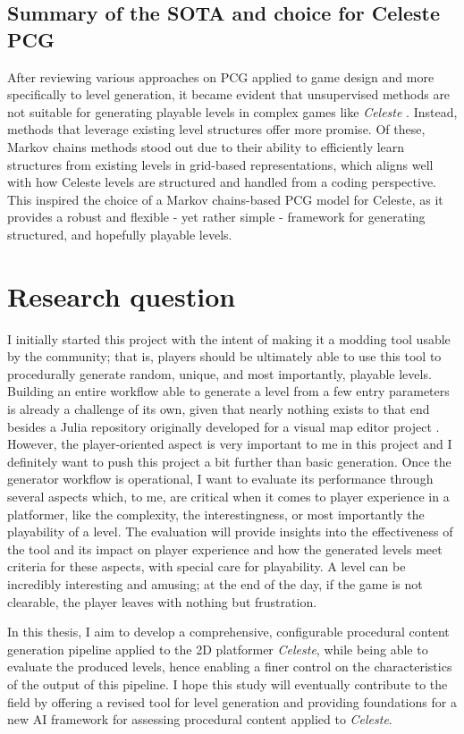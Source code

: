 \documentclass{article}
\newcommand{\Celeste}{\textit{Celeste} }
\newcommand{\Celnosp}{\textit{Celeste}}
\begin{document}
\subsection{Summary of the SOTA and choice for Celeste PCG}
After reviewing various approaches on PCG applied to game design and more specifically to level generation, it became evident that unsupervised methods are not suitable for generating playable levels in complex games like \Celeste. Instead, methods that leverage existing level structures offer more promise. Of these, Markov chains methods stood out due to their ability to efficiently learn structures from existing levels in grid-based representations, which aligns well with how Celeste levels are structured and handled from a coding perspective. This inspired the choice of a Markov chains-based PCG model for Celeste, as it provides a robust and flexible - yet rather simple - framework for generating structured, and hopefully playable levels.

\section{Research question} \label{RQ}
I initially started this project with the intent of making it a modding tool usable by the community; that is, players should be ultimately able to use this tool to procedurally generate random, unique, and most importantly, playable levels. Building an entire workflow able to generate a level from a few entry parameters is already a challenge of its own, given that nearly nothing exists to that end besides a Julia repository originally developed for a visual map editor project \cite{maple}. However, the player-oriented aspect is very important to me in this project and I definitely want to push this project a bit further than basic generation. Once the generator workflow is operational, I want to evaluate its performance through several aspects which, to me, are critical when it comes to player experience in a platformer, like the complexity, the interestingness, or most importantly the playability of a level. The evaluation will provide insights into the effectiveness of the tool and its impact on player experience and how the generated levels meet criteria for these aspects, with special care for playability. A level can be incredibly interesting and amusing; at the end of the day, if the game is not clearable, the player leaves with nothing but frustration.

\noindent In this thesis, I aim to develop a comprehensive, configurable procedural content generation pipeline applied to the 2D platformer \Celnosp, while being able to evaluate the produced levels, hence enabling a finer control on the characteristics of the output of this pipeline. I hope this study will eventually contribute to the field by offering a revised tool for level generation and providing foundations for a new AI framework for assessing procedural content applied to \Celnosp.
\end{document}
